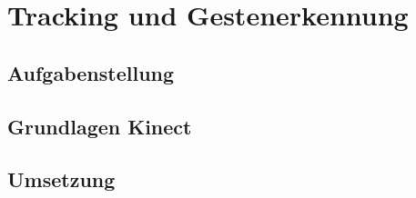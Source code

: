 
\chapter{Tracking und Gestenerkennung}

\section{Aufgabenstellung}
\label{kinect_aufgabenstellung_sec}
\authorsection{\editordummy}

\section{Grundlagen Kinect}
\label{kinect_grundlagen_sec}
\authorsection{\editordummy}

\section{Umsetzung}
\label{kinect_umsetzung_sec}
\authorsection{\editordummy}
